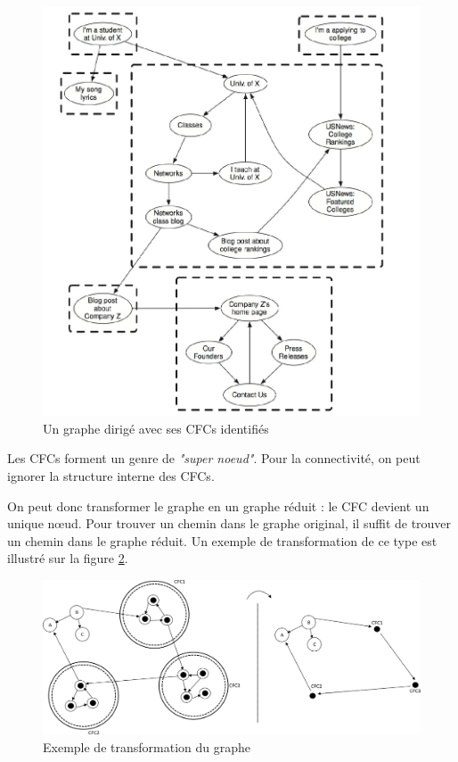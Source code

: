 \begin{figure}[!ht]
\centering
\includegraphics[scale=0.3]{images/23_fig13-6.png}
\caption{Un graphe dirigé avec ses CFCs identifiés}
\label{cfc_exemple}
\end{figure}

Les CFCs forment un genre de \textit{"super noeud"}. Pour la connectivité, on peut ignorer la structure interne des CFCs.

\vspace{0.3cm}

On peut donc transformer le graphe en un graphe réduit : le CFC devient un unique nœud. Pour trouver un chemin dans le graphe original, il suffit de trouver un chemin dans le graphe réduit.
Un exemple de transformation de ce type est illustré sur la figure \ref{cfc_transformation}.
\vspace{0.3cm}

\begin{figure}[!ht]
\centering
\includegraphics[width=0.85\linewidth]{images/23_schema2.png}
\caption{Exemple de transformation du graphe}
\label{cfc_transformation}
\end{figure}


